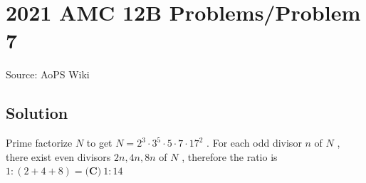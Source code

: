 \documentclass[12pt]{article}
\begin{document}
\section*{{2021 AMC 12B Problems/Problem 7}}
Source: AoPS Wiki

\subsection*{Solution}
Prime factorize $N$ to get $N=2^{3} \cdot 3^{5} \cdot 5\cdot 7\cdot 17^{2}$ . For each odd divisor $n$ of $N$ , there exist even divisors $2n, 4n, 8n$ of $N$ , therefore the ratio is $1:(2+4+8)=\boxed{\textbf{(C)} ~1 : 14}$
\end{document}
